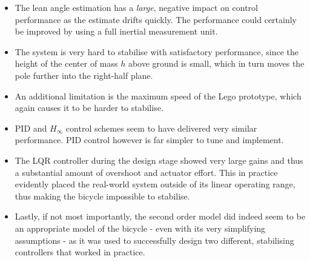 \begin{itemize}
\item{The lean angle estimation has a \textit{large}, negative impact on control performance as the estimate drifts quickly. The performance could certainly be improved by using a full inertial measurement unit.}
\item{The system is very hard to stabilise with satisfactory performance, since the height of the center of mass $h$ above ground is small, which in turn moves the pole further into the right-half plane.}
\item{An additional limitation is the maximum speed of the Lego prototype, which again causes it to be harder to stabilise.}
\item{PID and $H_{\infty}$ control schemes seem to have delivered very similar performance. PID control however is far simpler to tune and implement.}
\item{The LQR controller during the design stage showed very large gains and thus a substantial amount of overshoot and actuator effort. This in practice evidently placed the real-world system outside of its linear operating range, thus making the bicycle impossible to stabilise.}
\item{Lastly, if not most importantly, the second order model did indeed seem to be an appropriate model of the bicycle - even with its very simplifying assumptions - as it was used to successfully design two different, stabilising controllers that worked in practice.}
\end{itemize}